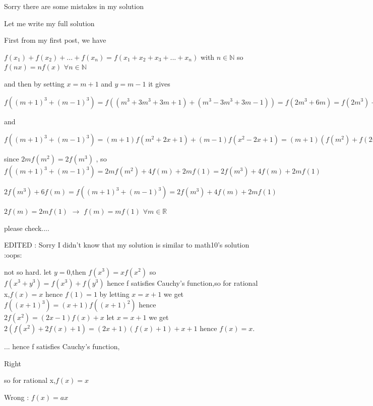 \begin{solution}
	Sorry there are some mistakes in my solution

Let me write my full solution

First from my first post, we have 

$ f(x_1)+f(x_2)+...+f(x_n)=f(x_1+x_2+x_3+...+x_n)$ with $ n\in\mathbb{N}$ so $ f(nx)=nf(x)$ $ \forall n\in\mathbb{N}$

and then by setting $ x=m+1$ and $ y=m-1$ it gives

$ f((m+1)^3+(m-1)^3)=f((m^3+3m^3+3m+1)+(m^3-3m^3+3m-1))=f(2m^3+6m)=f(2m^3)+f(6m)=2f(m^3)+6f(m)$

and

$ f((m+1)^3+(m-1)^3)=(m+1)f(m^2+2x+1)+(m-1)f(x^2-2x+1)=(m+1)\left(f(m^2)+f(2m)+f(1)\right)+(m-1)\left(f(m^2)+f(-2m)+f(1)\right)=2mf(m^2)+4f(m)+2mf(1)$

since $ 2mf(m^2)=2f(m^3)$ , so $ f((m+1)^3+(m-1)^3)=2mf(m^2)+4f(m)+2mf(1)=2f(m^3)+4f(m)+2mf(1)$

$ 2f(m^3)+6f(m)=f((m+1)^3+(m-1)^3)=2f(m^3)+4f(m)+2mf(1)$

$ 2f(m)=2mf(1)$ $ \rightarrow$ $ f(m)=mf(1)$ $ \forall m\in\mathbb{R}$

please check....

EDITED : Sorry I didn't know that my solution is similar to math10's solution  :oops:
\end{solution}



\begin{solution}
	not so hard.
let $y=0$,then
$f(x^3)=xf(x^2)$
so $f(x^3+y^3)=f(x^3)+f(y^3)$
hence f satisfies Cauchy's  function,so for rational x,$f(x)=x$
hence $f(1)=1$
by letting $x=x+1$ we get
$f((x+1)^3)=(x+1)f((x+1)^2)$
hence $2f(x^2)=(2x-1)f(x)+x$
let $x=x+1$
we get $2(f(x^2)+2f(x)+1)=(2x+1)(f(x)+1)+x+1$
hence $f(x)=x$.
\end{solution}



\begin{solution}
	\begin{tcolorbox} ... hence f satisfies Cauchy's  function,\end{tcolorbox}Right
\begin{tcolorbox}so for rational x,$f(x)=x$\end{tcolorbox}Wrong : $f(x)=ax$
\end{solution}



